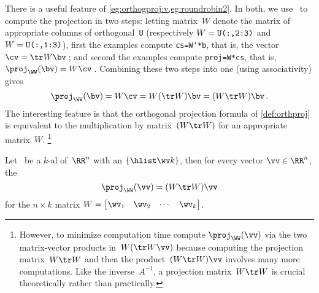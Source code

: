 There is a useful feature of \cref{eg:orthogproj:v,eg:roundrobin2}.
In both, we use \script\ to compute the projection in two steps: 
letting matrix~\(W\) denote the matrix of appropriate columns of orthogonal~\verb|U| (respectively \(W=\verb|U(:,2:3)|\) and \(W=\verb|U(:,1:3)|\)), first the examples compute \verb|cs=W'*b|, that is, the vector \(\cv=\tr W\bv\)\,; and second the examples compute \verb|proj=W*cs|, that is, \(\proj_\WW(\bv)=W\cv\)\,.
Combining these two steps into one (using associativity) gives
\begin{equation*}
\proj_\WW(\bv)=W\cv=W(\tr W)\bv=(W\tr W)\bv\,.
\end{equation*}
The interesting feature is that the orthogonal projection formula of \cref{def:orthproj} is equivalent to the multiplication by matrix~\((W\tr W)\) for an appropriate matrix~\(W\).%
\footnote{However, to minimize computation time compute \(\proj_\WW(\vv)\) via the two matrix-vector products in~\(W(\tr W\vv)\) because computing the projection matrix~\(W\tr W\) and then the product~\((W\tr W)\vv\) involves many more computations.  Like the inverse~\(A^{-1}\), a projection matrix~\(W\tr W\) is crucial theoretically  rather than practically.}



\begin{theorem} \label{thm:projmat}
Let \WW\ be a \(k\)-al  of~\(\RR^n\) with an  \(\{\hlist\wv k\}\), then for every vector \(\vv\in\RR^n\), the 
\begin{equation}
\proj_\WW(\vv)=(W\tr W)\vv
\end{equation}
for the \(n\times k\) matrix \(W=\begin{bmatrix} \wv_1&\wv_2&\cdots&\wv_k \end{bmatrix}\).
\end{theorem}

